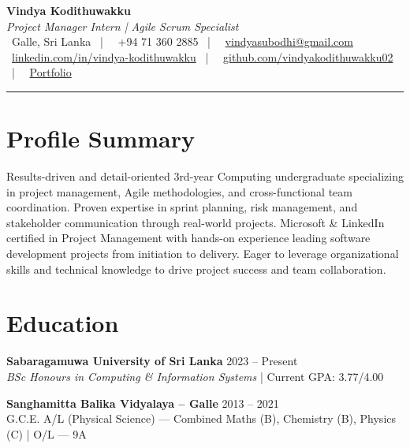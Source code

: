 \documentclass[letterpaper,10pt]{article}
\begin{document}
\begin{center}
{\Huge\color{accentTitle}\textbf{Vindya Kodithuwakku}}\\[3pt]
{\large\textit{Project Manager Intern | Agile Scrum Specialist}}\\[4pt]
\faMapMarker*~Galle, Sri Lanka ~|~
\faPhone~+94 71 360 2885 ~|~
\faEnvelope~\href{mailto:vindyasubodhi@gmail.com}{vindyasubodhi@gmail.com}\\[1pt]
\faLinkedin~\href{https://www.linkedin.com/in/vindya-kodithuwakku-bb6187202}{linkedin.com/in/vindya-kodithuwakku} ~|~
\faGithub~\href{https://github.com/vindyakodithuwakku02}{github.com/vindyakodithuwakku02} ~|~
\faGlobe~\href{https://vindyakodithuwakku02.github.io/my_portfolio/}{Portfolio}\\[4pt]
{\color{accentLine}\hrule}
\end{center}

\section{Profile Summary}
\vspace{-1pt}
Results-driven and detail-oriented 3rd-year Computing undergraduate specializing in project management, Agile methodologies, and cross-functional team coordination. Proven expertise in sprint planning, risk management, and stakeholder communication through real-world projects. Microsoft \& LinkedIn certified in Project Management with hands-on experience leading software development projects from initiation to delivery. Eager to leverage organizational skills and technical knowledge to drive project success and team collaboration.

\section{Education}
\vspace{-1pt}

\textbf{Sabaragamuwa University of Sri Lanka} \hfill 2023 – Present\\
\textit{BSc Honours in Computing \& Information Systems} | Current GPA: 3.77/4.00

\vspace{2pt}
\textbf{Sanghamitta Balika Vidyalaya – Galle} \hfill 2013 – 2021\\
G.C.E. A/L (Physical Science) — Combined Maths (B), Chemistry (B), Physics (C) | O/L — 9A
\end{document}
